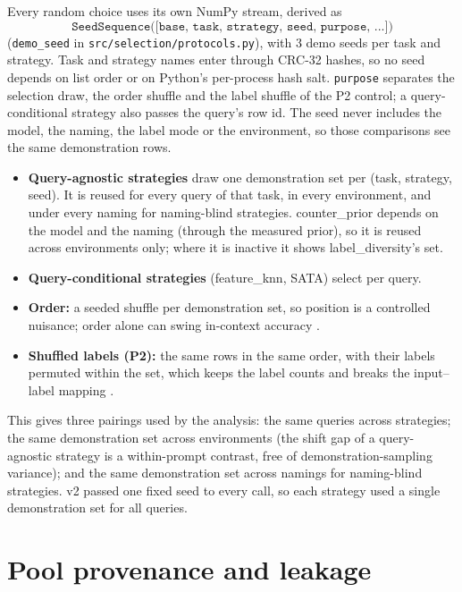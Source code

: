 \documentclass[11pt,a4paper]{article}
\newcommand{\1}{\mathbf{1}}
\theoremstyle{plain}
\theoremstyle{definition}
\theoremstyle{remark}
\newcommand{\status}[1]{\par\noindent\hfill\fcolorbox{black!35}{black!4}{\scriptsize\sffamily Status: #1}\par\medskip}
\begin{document}
Every random choice uses its own NumPy \citep{harris2020array} stream,
derived as
\[
  \texttt{SeedSequence([base, task, strategy, seed, purpose, ...])}
\]
(\texttt{demo\_seed} in \texttt{src/selection/protocols.py}), with 3 demo
seeds per task and strategy. Task and strategy names enter through CRC-32
hashes, so no seed depends on list order or on Python's per-process hash
salt. \texttt{purpose} separates the selection draw, the order shuffle and
the label shuffle of the P2 control; a query-conditional strategy also
passes the query's row id. The seed never includes the model, the naming,
the label mode or the environment, so those comparisons see the same
demonstration rows.

\begin{itemize}[nosep]
  \item \textbf{Query-agnostic strategies} draw one demonstration set per
        (task, strategy, seed). It is reused for every query of that task,
        in every environment, and under every naming for naming-blind
        strategies. counter\_prior depends on the model and the naming
        (through the measured prior), so it is reused across environments
        only; where it is inactive it shows label\_diversity's set.
  \item \textbf{Query-conditional strategies} (feature\_knn, SATA) select
        per query.
  \item \textbf{Order:} a seeded shuffle per demonstration set, so position
        is a controlled nuisance; order alone can swing in-context accuracy
        \citep{lu2022fantastically}.
  \item \textbf{Shuffled labels (P2):} the same rows in the same order, with
        their labels permuted within the set, which keeps the label counts
        and breaks the input--label mapping \citep{min2022rethinking}.
\end{itemize}

This gives three pairings used by the analysis: the same queries across
strategies; the same demonstration set across environments (the shift gap
of a query-agnostic strategy is a within-prompt contrast, free of
demonstration-sampling variance); and the same demonstration set across
namings for naming-blind strategies. v2 passed one fixed seed to every call,
so each strategy used a single demonstration set for all queries.

\section{Pool provenance and leakage}
\status{Implemented (P1)}
\end{document}
